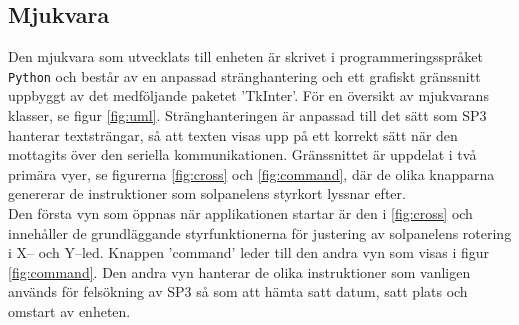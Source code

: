 \documentclass{article}
\begin{document}
        \subsection{Mjukvara} %
        \label{sub:mjukvara}
         Den mjukvara som utvecklats till enheten är skrivet i programmeringsspråket \texttt{Python} och består av en anpassad stränghantering och ett grafiskt gränssnitt uppbyggt av det medföljande paketet 'TkInter'. För en översikt av mjukvarans klasser, se figur \ref{fig:uml}. Sträng\-hanteringen är anpassad till det sätt som SP3 hanterar textsträngar, så att texten visas upp på ett korrekt sätt när den mottagits över den seriella kommunikationen. Gränssnittet är uppdelat i två primära vyer, se figurerna \ref{fig:cross} och \ref{fig:command}, där de olika knapparna genererar de instruktioner som solpanelens styrkort lyssnar efter. \\

        \noindent Den första vyn som öppnas när applikationen startar är den i \ref{fig:cross} och innehåller de grund\-läggande styrfunktionerna för justering av solpanelens rotering i X-- och Y--led. Knappen 'command' leder till den andra vyn som visas i figur \ref{fig:command}. Den andra vyn hanterar de olika instruktioner som vanligen används för felsökning av SP3 så som att hämta satt datum, satt plats och omstart av enheten.
      
\end{document}
